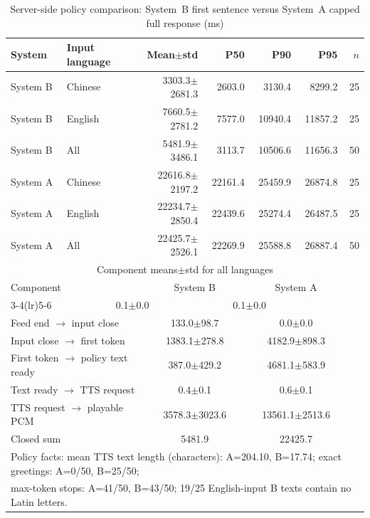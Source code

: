 \documentclass[conference]{IEEEtran}
\begin{document}
\begin{table}[!t]
\caption{Server-side policy comparison: System~B first sentence versus System~A capped full response (ms)}\label{tab:ttfa}
\centering
\scriptsize
\begin{tabular}{@{}llrrrrr@{}}
\toprule
System & Input language & Mean$\pm$std & P50 & P90 & P95 & $n$ \\
\midrule
System B & Chinese & 3303.3$\pm$2681.3 & 2603.0 & 3130.4 & 8299.2 & 25 \\
System B & English & 7660.5$\pm$2781.2 & 7577.0 & 10940.4 & 11857.2 & 25 \\
System B & All & 5481.9$\pm$3486.1 & 3113.7 & 10506.6 & 11656.3 & 50 \\
System A & Chinese & 22616.8$\pm$2197.2 & 22161.4 & 25459.9 & 26874.8 & 25 \\
System A & English & 22234.7$\pm$2850.4 & 22439.6 & 25274.4 & 26487.5 & 25 \\
System A & All & 22425.7$\pm$2526.1 & 22269.9 & 25588.8 & 26887.4 & 50 \\
\midrule
\multicolumn{7}{c}{Component means$\pm$std for all languages} \\
\midrule
\multicolumn{2}{l}{Component} & \multicolumn{2}{c}{System B} & \multicolumn{2}{c}{System A} & \\
\cmidrule(lr){3-4}\cmidrule(lr){5-6}
\multicolumn{2}{l}{Speech end $\rightarrow$ feed end} & \multicolumn{2}{c}{0.1$\pm$0.0} & \multicolumn{2}{c}{0.1$\pm$0.0} & \\
\multicolumn{2}{l}{Feed end $\rightarrow$ input close} & \multicolumn{2}{c}{133.0$\pm$98.7} & \multicolumn{2}{c}{0.0$\pm$0.0} & \\
\multicolumn{2}{l}{Input close $\rightarrow$ first token} & \multicolumn{2}{c}{1383.1$\pm$278.8} & \multicolumn{2}{c}{4182.9$\pm$898.3} & \\
\multicolumn{2}{l}{First token $\rightarrow$ policy text ready} & \multicolumn{2}{c}{387.0$\pm$429.2} & \multicolumn{2}{c}{4681.1$\pm$583.9} & \\
\multicolumn{2}{l}{Text ready $\rightarrow$ TTS request} & \multicolumn{2}{c}{0.4$\pm$0.1} & \multicolumn{2}{c}{0.6$\pm$0.1} & \\
\multicolumn{2}{l}{TTS request $\rightarrow$ playable PCM} & \multicolumn{2}{c}{3578.3$\pm$3023.6} & \multicolumn{2}{c}{13561.1$\pm$2513.6} & \\
\multicolumn{2}{l}{Closed sum} & \multicolumn{2}{c}{5481.9} & \multicolumn{2}{c}{22425.7} & \\
\midrule
\multicolumn{7}{l}{\footnotesize Policy facts: mean TTS text length (characters): A=204.10, B=17.74; exact greetings: A=0/50, B=25/50;}\\
\multicolumn{7}{l}{\footnotesize max-token stops: A=41/50, B=43/50; 19/25 English-input B texts contain no Latin letters.}\\
\bottomrule
\end{tabular}
\end{table}
\end{document}
